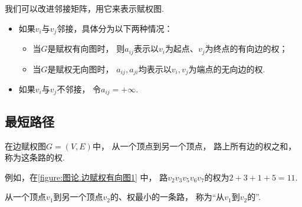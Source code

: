 我们可以改进邻接矩阵，用它来表示赋权图.
\begin{itemize}
	\item 如果\(v_i\)与\(v_j\)邻接，具体分为以下两种情况：\begin{itemize}
		\item 当\(G\)是赋权有向图时，
		则\(a_{ij}\)表示以\(v_i\)为起点、\(v_j\)为终点的有向边的权；
		\item 当\(G\)是赋权无向图时，
		\(a_{ij},a_{ji}\)均表示以\(v_i,v_j\)为端点的无向边的权.
	\end{itemize}
	\item 如果\(v_i\)与\(v_j\)不邻接，
	令\(a_{ij} = +\infty\).
\end{itemize}


\subsection{最短路径}
在边赋权图\(G = (V,E)\)中，
从一个顶点到另一个顶点，
路上所有边的权之和，
称为这条路的权.

例如，在\cref{figure:图论.边赋权有向图1} 中，
路\(v_2 v_3 v_5 v_6 v_7\)的权为\(2+3+1+5=11\).

从一个顶点\(v_1\)到另一个顶点\(v_2\)的、权最小的一条路，
称为“从\(v_1\)到\(v_2\)的”.
